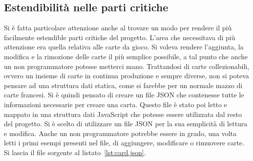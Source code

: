 \subsection{Estendibilità nelle parti critiche}
Si è fatta particolare attenzione anche al trovare un modo per rendere il più facilmente estendible parti critiche del progetto. L'area che necessitava di più attenzione era quella
relativa alle carte da gioco. Si voleva rendere l'aggiunta, la modifica e la rimozione delle carte il più semplice possibile, a tal punto che anche un non programmatore potesse 
metterci mano. Trattandosi di carte collezionabili, ovvero un insieme di carte in continua produzione e sempre diverse, non si poteva pensare ad una struttura dati statica, come si 
farebbe per un normale mazzo di carte francesi. Si è quindi pensato di creare un file JSON che contenesse tutte le informazioni necessarie per creare una carta. Questo file è stato
poi letto e mappato in una struttura dati JavaScript che potesse essere utilizzata dal resto del progetto. Si è scelto di utilizzare un file JSON per la sua semplicità di lettura e
modifica. Anche un non programmatore potrebbe essere in grado, una volta letti i primi esempi presenti nel file, di aggiungere, modificare o rimuovere carte. Si lascia il
file sorgente al listato~\ref{lst:card.json}.

